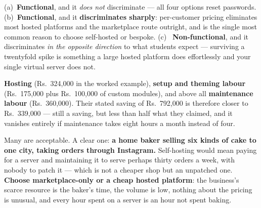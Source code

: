 \begin{ans}
  \item (a)~\textbf{Functional}, and it \emph{does not} discriminate --- all
        four options reset passwords. (b)~\textbf{Functional}, and it
        \textbf{discriminates sharply}: per-customer pricing eliminates most
        hosted platforms and the marketplace route outright, and is the single
        most common reason to choose self-hosted or bespoke. (c)~\textbf{
        Non-functional}, and it discriminates \emph{in the opposite direction}
        to what students expect --- surviving a twentyfold spike is something a
        large hosted platform does effortlessly and your single virtual server
        does not.
  \item \textbf{Hosting} (Rs.~324{,}000 in the worked example),
        \textbf{setup and theming labour} (Rs.~175{,}000 plus
        Rs.~100{,}000 of custom modules), and above all \textbf{maintenance
        labour} (Rs.~360{,}000). Their stated saving of Rs.~792{,}000 is
        therefore closer to Rs.~339{,}000 --- still a saving, but less than
        half what they claimed, and it vanishes entirely if maintenance takes
        eight hours a month instead of four.
  \item Many are acceptable. A clear one: \textbf{a home baker selling six
        kinds of cake to one city, taking orders through Instagram.} Self-hosting
        would mean paying for a server and maintaining it to serve perhaps
        thirty orders a week, with nobody to patch it --- which is not a
        cheaper shop but an unpatched one. \textbf{Choose marketplace-only or a
        cheap hosted platform}: the business's scarce resource is the baker's
        time, the volume is low, nothing about the pricing is unusual, and
        every hour spent on a server is an hour not spent baking.
\end{ans}

